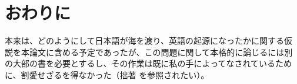 \chapter{おわりに}

本来は、どのようにして日本語が海を渡り、英語の起源になったかに関する仮
説を本論文に含める予定であったが、この問題に関して本格的に論じるには別
の大部の書を必要とするし、その作業は既に私の手によってなされているため
に、割愛せざるを得なかった（拙著 を参照されたい）。

